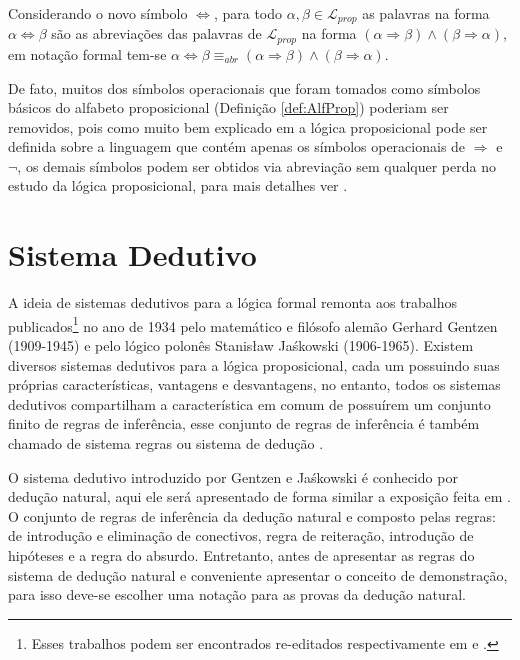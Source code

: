 \begin{definition}\label{def:SeSomenteSeAbreviatura}
    Considerando o novo símbolo $\Leftrightarrow$, para todo $\alpha, \beta \in \mathcal{L}_{prop}$ as palavras na forma $\alpha \Leftrightarrow \beta$ são as abreviações das palavras de $\mathcal{L}_{prop}$ na forma $(\alpha \Rightarrow \beta) \land (\beta \Rightarrow \alpha)$, em notação formal tem-se $\alpha \Leftrightarrow \beta \equiv_{abr} (\alpha \Rightarrow \beta) \land (\beta \Rightarrow \alpha)$.
\end{definition}

De fato, muitos dos símbolos operacionais que foram tomados como símbolos básicos do alfabeto proposicional (Definição \ref{def:AlfProp}) poderiam ser removidos, pois como muito bem explicado em \cite{BenjaV1, joaoPavao2014} a lógica proposicional pode ser definida sobre a linguagem que contém apenas os símbolos operacionais de $\Rightarrow$ e $\neg$, os demais símbolos podem ser obtidos via abreviação sem qualquer perda no estudo da lógica proposicional, para mais detalhes ver \cite{BenjaV1}.

\section{Sistema Dedutivo}\label{sec:SistemaDedutivo}

A ideia de sistemas dedutivos para a lógica formal remonta aos trabalhos publicados\footnote{Esses trabalhos podem ser encontrados re-editados respectivamente em \cite{gentzen1969} e \cite{jaskowski1934}.} no ano de 1934 pelo matemático e filósofo alemão Gerhard Gentzen (1909-1945) e pelo lógico polonês Stanisław Jaśkowski (1906-1965). Existem diversos sistemas dedutivos para a lógica proposicional, cada um possuindo suas próprias características, vantagens e desvantagens, no entanto, todos os sistemas dedutivos compartilham a característica em comum de possuírem um conjunto finito de regras de inferência, esse conjunto de regras de inferência é também chamado de sistema regras ou sistema de dedução \cite{edgar2002}.

O sistema dedutivo introduzido por Gentzen e Jaśkowski é conhecido por dedução natural, aqui ele será apresentado de forma similar a exposição feita em \cite{joaoPavao2014}. O conjunto de regras de inferência da dedução natural e composto pelas regras: de introdução e eliminação de conectivos, regra de reiteração, introdução de hipóteses e a regra do absurdo. Entretanto, antes de apresentar as regras do sistema de dedução natural e conveniente apresentar o conceito de demonstração, para isso deve-se escolher uma notação para as provas da dedução natural.

